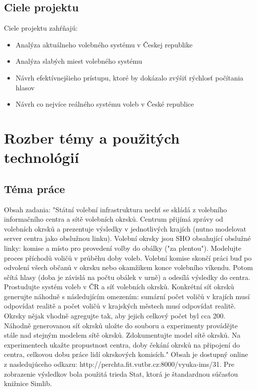 \documentclass[12pt,a4paper,titlepage,final]{article}
\begin{document}
\subsection{Ciele projektu}
Ciele projektu zahŕňajú:
\begin{itemize}
\item Analýza aktuálneho volebného systému v Českej republike
\item Analýza slabých miest volebného systému
\item Návrh efektívnejšieho prístupu, ktoré by dokázalo zvýšiť rýchlosť počítania hlasov
\item Návrh co nejvíce reálného systému voleb v České republice 
\end{itemize}


\section{Rozber témy a použitých technológií}

\indent

\subsection{Téma práce}
Obsah zadania: "Státní volební infrastruktura nechť se skládá z volebního informačního centra a sítě volebních okrsků. Centrum přijímá zprávy od volebních okrsků a prezentuje výsledky v jednotlivých krajích (nutno modelovat server centra jako obslužnou linku). Volební okrsky jsou SHO obsahující obslužné linky: komise a místo pro provedení volby do obálky ("za plentou"). Modelujte proces příchodů voličů v průběhu doby voleb. Volební komise skončí práci buď po odvolení všech občanů v okrsku nebo okamžikem konce volebního víkendu. Potom sčítá hlasy (doba je závislá na počtu obálek v urně) a odesílá výsledky do centra. Prostudujte systém voleb v ČR a síť volebních okrsků. Konkrétní síť okrsků generujte náhodně s následujícím omezením: sumární počet voličů v krajích musí odpovídat realitě a počet voličů v krajských městech musí odpovídat realitě. Okrsky nějak vhodně agregujte tak, aby jejich celkový počet byl cca 200. Náhodně generovanou síť okrsků uložte do souboru a experimenty provádějte stále nad stejným modelem sítě okrsků. Zdokumentujte model sítě okrsků. Na experimentech ukažte propustnost centra, doby čekání okrsků na připojení do centra, celkovou dobu práce lidí okrskových komisích."
Obsah je dostupný online z nasledujúceho odkazu: http://perchta.fit.vutbr.cz:8000/vyuka-ims/31.\cite{Prokop:Algoritmy}
Pre zobrazenie výsledkov bola použitá trieda Stat, ktorá je štandardnou súčasťou knižnice Simlib.
\end{document}
